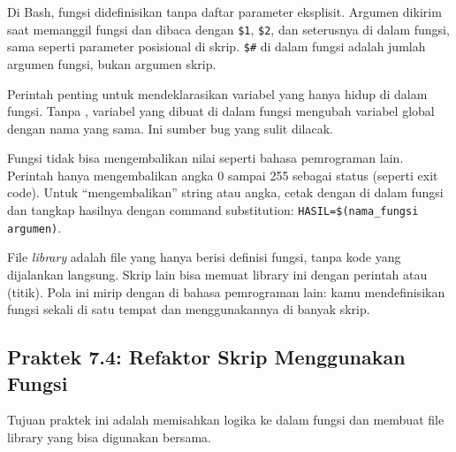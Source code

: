 Di Bash, fungsi didefinisikan tanpa daftar parameter eksplisit. Argumen
dikirim saat memanggil fungsi dan dibaca dengan \texttt{\$1},
\texttt{\$2}, dan seterusnya di dalam fungsi, sama seperti parameter
posisional di skrip. \texttt{\$\#} di dalam fungsi adalah jumlah argumen
fungsi, bukan argumen skrip.

Perintah  penting untuk mendeklarasikan variabel yang hanya
hidup di dalam fungsi. Tanpa , variabel yang dibuat di dalam
fungsi mengubah variabel global dengan nama yang sama. Ini sumber bug
yang sulit dilacak.

Fungsi tidak bisa mengembalikan nilai seperti bahasa pemrograman lain.
Perintah  hanya mengembalikan angka 0 sampai 255 sebagai
status (seperti exit code). Untuk ``mengembalikan'' string atau angka,
cetak dengan  di dalam fungsi dan tangkap hasilnya dengan
command substitution: \texttt{HASIL=\$(nama\_fungsi argumen)}.

File \textit{library} adalah file yang hanya berisi definisi fungsi,
tanpa kode yang dijalankan langsung. Skrip lain bisa memuat library ini
dengan perintah  atau  (titik). Pola ini mirip dengan
 di bahasa pemrograman lain: kamu mendefinisikan fungsi sekali
di satu tempat dan menggunakannya di banyak skrip.

\subsection*{Praktek 7.4: Refaktor Skrip Menggunakan Fungsi}

Tujuan praktek ini adalah memisahkan logika ke dalam fungsi dan
membuat file library yang bisa digunakan bersama.

